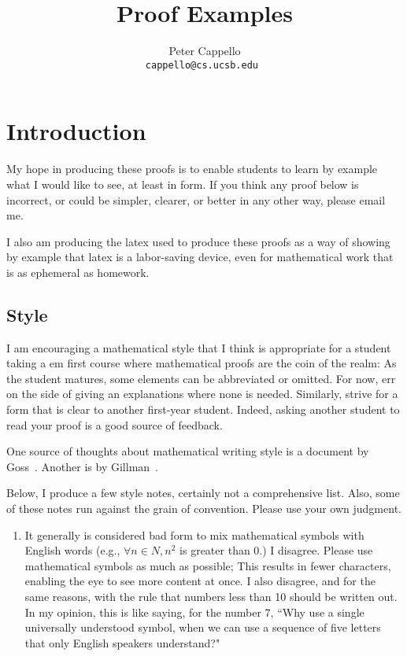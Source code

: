 \documentclass{article}
\title{Proof Examples}
\author{Peter Cappello \\ \tt{cappello@cs.ucsb.edu} }
\date{}
\begin{document}
\maketitle

\section*{Introduction}

My hope in producing these proofs is to enable students to learn by example what I would like to see, at least in form.
If you think any proof below is incorrect, or could be simpler, clearer, or better in any other way, please email me.

I also am producing the latex used to produce these proofs as a way of showing by example that latex is a labor-saving device, 
even for mathematical work that is as ephemeral as homework.

\subsection*{Style}

I am encouraging a mathematical style that I think is appropriate for a student taking a {em first} course where mathematical proofs are the coin of the realm:
As the student matures, some elements can be abbreviated or omitted.
For now, err on the side of giving an explanations where none is needed.
Similarly, strive for a form that is clear to another first-year student.
Indeed, asking another student to read your proof is a good source of feedback.

One source of thoughts about mathematical writing style is a document by Goss~\cite{Goss}.
Another is by Gillman~\cite{Gillman}.

Below, I produce a few style notes, certainly not a comprehensive list.
Also, some of these notes run against the grain of convention.
Please use your own judgment.

\begin{enumerate}

    \item
    It generally is considered bad form to mix mathematical symbols with English words 
    (e.g., $\forall n \in N, n^2$ is greater than 0.)
    I disagree.
    Please use mathematical symbols as much as possible;
    This results in fewer characters, enabling the eye to see more content at once.
    I also disagree, and for the same reasons, with the rule that numbers less than 10 should be written out.
    In my opinion, this is like saying, for the number 7, 
    ``Why use a single universally understood symbol, when we can use a sequence of five letters that only English speakers understand?"
\end{enumerate}
\end{document}
